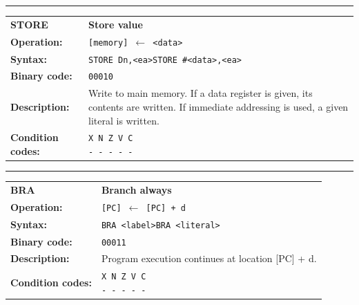 \documentclass[]{article}
\begin{document}
\begin{appendices}
\noindent\rule{10cm}{1pt}\newline %
\setlength\extrarowheight{5pt} %
\begin{tabularx}{\textwidth}{lL}
  {\Large \textbf{STORE}} 	& {\Large \textbf{Store value}}\\
  \textbf{Operation:} 		& \texttt{[memory] $\leftarrow$ <data>}\\
  \textbf{Syntax:}  		& \texttt{STORE Dn,<ea>}\newline\texttt{STORE \#<data>,<ea>}\\
    \textbf{Binary code:} 	& \texttt{00010}\\
  \textbf{Description:}  	& Write to main memory. If a data register is given, its contents are written. If immediate addressing is used, a given literal is written.\\
  \textbf{Condition codes:} & \texttt{X N Z V C\newline - - - - -}\\
\end{tabularx}
\newline

\newpage

\noindent\rule{10cm}{1pt}\newline %
\setlength\extrarowheight{5pt} %
\begin{tabularx}{\textwidth}{lL}
  {\Large \textbf{BRA}} 	& {\Large \textbf{Branch always}}\\
  \textbf{Operation:} 		& \texttt{[PC] $\leftarrow$ [PC] + d}\\
  \textbf{Syntax:}  		& \texttt{BRA <label>}\newline\texttt{BRA <literal>}\\
  \textbf{Binary code:} 	& \texttt{00011}\\
  \textbf{Description:}  	& Program execution continues at location [PC] + d.\\
  \textbf{Condition codes:} & \texttt{X N Z V C\newline - - - - -}\\
\end{tabularx}
\newline


\end{appendices}
\end{document}
